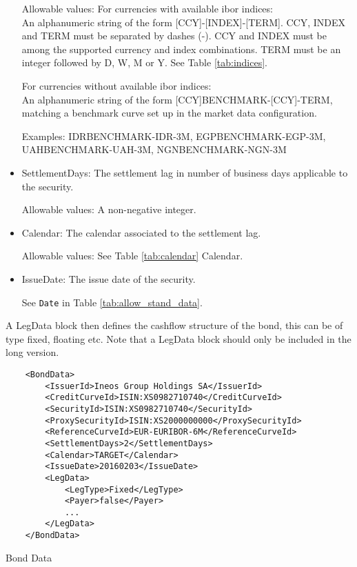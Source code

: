 \begin{itemize}
Allowable values: 
For currencies with available ibor indices: \\
An alphanumeric string of the form [CCY]-[INDEX]-[TERM]. CCY, INDEX and TERM must be separated by dashes (-). CCY and INDEX must be among the supported currency and index combinations. TERM must be an integer followed by D, W, M or Y. See Table \ref{tab:indices}. 

For currencies without available ibor indices:  \\
An alphanumeric string of the form [CCY]BENCHMARK-[CCY]-TERM, matching a benchmark curve set up in the market data configuration.

Examples: IDRBENCHMARK-IDR-3M, EGPBENCHMARK-EGP-3M, UAHBENCHMARK-UAH-3M, NGNBENCHMARK-NGN-3M
 
\item SettlementDays: The settlement lag in number of business days applicable to the security.

Allowable values: A non-negative integer.

\item Calendar: The calendar associated to the settlement lag.

Allowable values: See Table \ref{tab:calendar} Calendar.

\item IssueDate: The issue date of the security.

See \lstinline!Date! in Table \ref{tab:allow_stand_data}.

\end{itemize}

A LegData block then defines the cashflow structure of the bond, this can be of type fixed, floating etc. Note that a LegData block should only be included in the long version. 

\begin{listing}[H]
\begin{verbatim}
    <BondData>
        <IssuerId>Ineos Group Holdings SA</IssuerId>
        <CreditCurveId>ISIN:XS0982710740</CreditCurveId>
        <SecurityId>ISIN:XS0982710740</SecurityId>
        <ProxySecurityId>ISIN:XS2000000000</ProxySecurityId>
        <ReferenceCurveId>EUR-EURIBOR-6M</ReferenceCurveId>
        <SettlementDays>2</SettlementDays>
        <Calendar>TARGET</Calendar>
        <IssueDate>20160203</IssueDate>
        <LegData>
            <LegType>Fixed</LegType>
            <Payer>false</Payer>
            ...
        </LegData>
    </BondData>
\end{verbatim}
\caption{Bond Data}
\label{lst:bonddata}
\end{listing}

